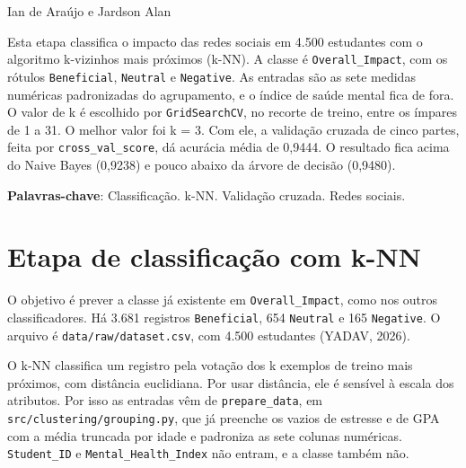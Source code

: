\documentclass[
  article,
  12pt,
  oneside,
  a4paper,
  english,
  brazil,
  chapter=TITLE,
  section=TITLE,
  subsection=TITLE
]{abntex2}
\renewcommand{\imprimircapa}{%
  \begin{capa}%
    \SingleSpacing
    \begin{center}
      \imprimirinstituicao\par
      \vspace*{\fill}
      \imprimirautor\par
      \vspace*{\fill}
      {\bfseries\imprimirtitulo\par}
      \vspace*{\fill}
      \imprimirlocal\par
      \imprimirdata\par
    \end{center}
    \vspace*{1cm}
  \end{capa}%
}
\begin{document}
\pretextual
\imprimircapa
\imprimirfolhaderosto

\textual

\begin{center}
  \bfseries\imprimirtitulo
\end{center}

\vspace{0.75\baselineskip}
\noindent Ian de Araújo\footnotemark{} e Jardson Alan\footnotemark[\value{footnote}]

\begin{resumo}
Esta etapa classifica o impacto das redes sociais em 4.500 estudantes com o algoritmo k-vizinhos mais próximos (k-NN). A classe é \texttt{Overall\_Impact}, com os rótulos \texttt{Beneficial}, \texttt{Neutral} e \texttt{Negative}. As entradas são as sete medidas numéricas padronizadas do agrupamento, e o índice de saúde mental fica de fora. O valor de k é escolhido por \texttt{GridSearchCV}, no recorte de treino, entre os ímpares de 1 a 31. O melhor valor foi k = 3. Com ele, a validação cruzada de cinco partes, feita por \texttt{cross\_val\_score}, dá acurácia média de 0,9444. O resultado fica acima do Naive Bayes (0,9238) e pouco abaixo da árvore de decisão (0,9480).

\vspace{\onelineskip}
\noindent
\textbf{Palavras-chave}: Classificação. k-NN. Validação cruzada. Redes sociais.
\end{resumo}

\section{Etapa de classificação com k-NN}

O objetivo é prever a classe já existente em \texttt{Overall\_Impact}, como nos outros classificadores. Há 3.681 registros \texttt{Beneficial}, 654 \texttt{Neutral} e 165 \texttt{Negative}. O arquivo é \texttt{data/raw/}\allowbreak\texttt{dataset.csv}, com 4.500 estudantes (YADAV, 2026).

O k-NN classifica um registro pela votação dos k exemplos de treino mais próximos, com distância euclidiana. Por usar distância, ele é sensível à escala dos atributos. Por isso as entradas vêm de \texttt{prepare\_data}, em \texttt{src/clustering/}\allowbreak\texttt{grouping.py}, que já preenche os vazios de estresse e de GPA com a média truncada por idade e padroniza as sete colunas numéricas. \texttt{Student\_ID} e \texttt{Mental\_Health\_Index} não entram, e a classe também não.
\end{document}
